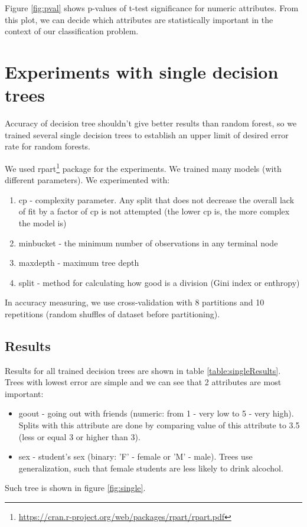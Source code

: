 \documentclass[a4paper]{article}
\begin{document}
Figure \ref{fig:pval} shows p-values of t-test significance for numeric attributes.
From this plot, we can decide which attributes are statistically important
in the context of our classification problem.



\section{Experiments with single decision trees}
\label{expSingle}

Accuracy of decision tree shouldn't give better results than random forest,
so we trained several single decision trees to establish
an upper limit of desired error rate for random forests.

We used rpart\footnote{\url{https://cran.r-project.org/web/packages/rpart/rpart.pdf}} package for the experiments.
We trained many models (with different parameters).
We experimented with:
\begin{enumerate}
    \item cp - complexity parameter.
        Any split that does not decrease the overall lack of fit by a factor of cp is not attempted
        (the lower cp is, the more complex the model is)
    \item minbucket - the minimum number of observations in any terminal node
    \item maxdepth - maximum tree depth
    \item split - method for calculating how good is a division (Gini index or enthropy)
\end{enumerate}
In accuracy measuring, we use cross-validation with 8 partitions
and 10 repetitions (random shuffles of dataset before partitioning).
% 
\subsection{Results}
\label{singleConc}

Results for all trained decision trees are shown in table \ref{table:singleResults}.
Trees with lowest error are simple and we can see that 2 attributes are most important:
\begin{itemize}
    \item goout - going out with friends (numeric: from 1 - very low to 5 - very high).
        Splits with this attribute are done by comparing value of this attribute to 3.5
        (less or equal 3 or higher than 3).
    \item sex - student's sex (binary: 'F' - female or 'M' - male).
        Trees use generalization, such that female students are less likely to drink alcochol.
\end{itemize}
Such tree is shown in figure \ref{fig:single}.
\end{document}
